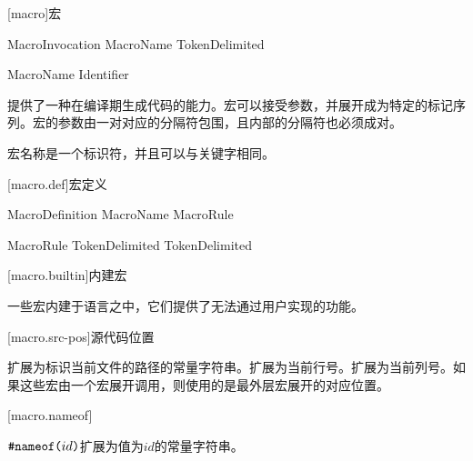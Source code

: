 
[macro]{宏}

\begin{bnf}{MacroInvocation}
    \terminal{\#} MacroName TokenDelimited\bnfq
\end{bnf}

\begin{bnf}{MacroName}
    Identifier
\end{bnf}

\pnum
{}提供了一种在编译期生成代码的能力。宏可以接受参数，并展开成为特定的标记序列。宏的参数由一对对应的分隔符包围，且内部的分隔符也必须成对。

\pnum
宏名称是一个标识符，并且可以与关键字相同。

[macro.def]{宏定义}

\begin{bnf}{MacroDefinition}
     MacroName \terminal{\{} MacroRule\bnfs \terminal{\}}
\end{bnf}

\begin{bnf}{MacroRule}
    TokenDelimited \terminal{->} TokenDelimited
\end{bnf}

[macro.builtin]{内建宏}

\pnum
一些宏内建于语言之中，它们提供了无法通过用户实现的功能。

[macro.src-pos]{源代码位置}

\pnum
{}扩展为标识当前文件的路径的常量字符串。扩展为当前行号。扩展为当前列号。如果这些宏由一个宏展开调用，则使用的是最外层宏展开的对应位置。

[macro.nameof]{}

\pnum
$\texttt{\#nameof(}id\texttt{)}$扩展为值为$id$的常量字符串。